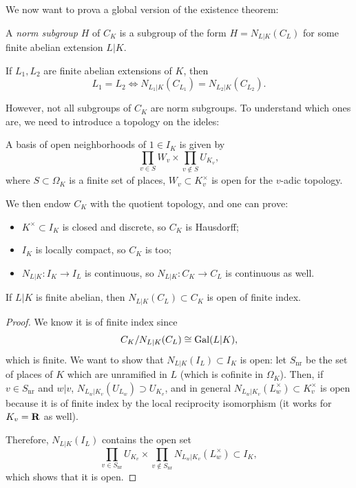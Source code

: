 \documentclass{article}
\begin{document}

We now want to prova a global version of the existence theorem:
\begin{defn}
		A \emph{norm subgroup} $H$ of $C_K$ is a subgroup of the form $H=N_{L|K}(C_L)$ for some finite abelian extension $L|K$.
\end{defn}
\begin{cor}
		If $L_1,L_2$ are finite abelian extensions of $K$, then
		\[
			L_1=L_2 \iff N_{L_1|K}(C_{L_1}) = N_{L_2|K}(C_{L_2}).
		\]
\end{cor}
However, not all subgroups of $C_K$ are norm subgroups. To understand which ones are, we need to introduce a topology on the ideles:
\begin{defn}
		A basis of open neighborhoods of $1\in I_K$ is given by 
\[
\prod_{v\in S} W_v \times \prod_{v\notin S} U_{K_v},
\]
		where $S\subset \Omega_K$ is a finite set of places, $W_v\subset K_v^\times$ is open for the $v$-adic topology.
\end{defn}
We then endow $C_K$ with the quotient topology, and one can prove:
\begin{itemize}
		\item $K^\times \subset I_K$ is closed and discrete, so $C_K$ is Hausdorff;
		\item $I_K$ is locally compact, so $C_K$ is too;
		\item $N_{L|K}: I_K \to I_L$ is continuous, so $N_{L|K}: C_K \to C_L$ is continuous as well.
\end{itemize}
\begin{lem}
		If $L|K$ is finite abelian, then $N_{L|K}(C_L)\subset C_K$ is open of finite index.
\end{lem}
\begin{proof}
	We know it is of finite index since
	\[
		C_K / N_{L|K}(C_L) \cong \operatorname{Gal}(L|K),
	\]
	which is finite.
	We want to show that $N_{L|K}(I_L)\subset I_K$ is open: let $S_{\text{nr}}$ be the set of places of $K$ which are unramified in $L$ (which is cofinite in $\Omega_K$). Then, if $v\in S_{\text{nr}}$ and $w|v$, $N_{L_w|K_v}(U_{L_w})\supset U_{K_v}$, and in general $N_{L_w|K_v}(L_w^\times)\subset K_v^\times$ is open because it is of finite index by the local reciprocity isomorphism (it works for $K_v=\mathbf{R}$ as well).
	
	Therefore, $N_{L|K}(I_L)$ contains the open set
	\[
		\prod_{v\in S_{\text{nr}}} U_{K_v} \times \prod_{v\notin S_{\text{nr}}} N_{L_w|K_v}(L_w^\times) \subset I_K,
	\]
		which shows that it is open.
\end{proof}
\end{document}
